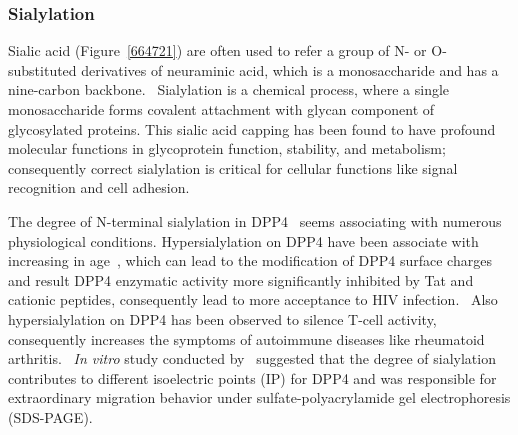 \subsubsection {Sialylation}
Sialic acid (Figure~\ref{664721}) are often used to refer a group of N- or O-substituted derivatives of neuraminic acid, which is a monosaccharide and has a nine-carbon backbone.~\cite{Vocadlo_2009} Sialylation is a chemical process, where a single monosaccharide forms covalent attachment with glycan component of glycosylated proteins. This sialic acid capping has been found to have profound molecular functions in glycoprotein function, stability, and metabolism; consequently correct sialylation is critical for cellular functions like signal recognition and cell adhesion.~\cite{Bhide_2016}
\par 
The degree of N-terminal sialylation in DPP4~\cite{Stehling_1999} seems associating with numerous physiological conditions. Hypersialylation on DPP4 have been associate with increasing in age~\cite{SMITH_1998}, which can lead to the modification of DPP4 surface charges and result DPP4 enzymatic activity more significantly inhibited by Tat and cationic peptides, consequently lead to more acceptance to HIV infection.~\cite{SMITH_1998} Also hypersialylation on DPP4 has been observed to silence T-cell activity, consequently increases the symptoms of autoimmune diseases like rheumatoid arthritis.~\cite{Cuchacovich2001}  \cite{K_hne_1996} 
\textit{In vitro} study conducted by~\citet{Schmauser1999} suggested that the degree of sialylation contributes to different isoelectric points (IP) for DPP4 and was responsible for extraordinary migration behavior under sulfate-polyacrylamide gel electrophoresis (SDS-PAGE).